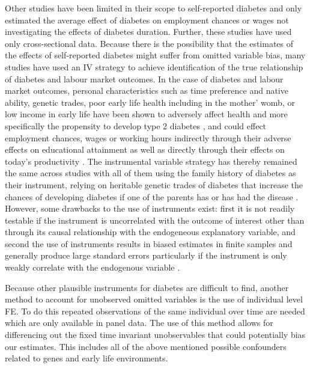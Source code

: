 Other studies have been limited in their scope to self-reported diabetes
and only estimated the average effect of diabetes on employment chances
or wages not investigating the effects of diabetes duration. Further,
these studies have used only cross-sectional data. Because there is
the possibility that the estimates of the effects of self-reported
diabetes might suffer from omitted variable bias, many studies have
used an \ac{IV} strategy to achieve identification of the true relationship
of diabetes and labour market outcomes. In the case of diabetes and
labour market outcomes, personal characteristics such as time preference
and native ability, genetic trades, poor early life health including
in the mother' womb, or low income in early life have been shown to
adversely affect health and more specifically the propensity to develop
type 2 diabetes \citep{VanEwijk2011a,Sotomayor2013,Li2010b}, and
could effect employment chances, wages or working hours indirectly
through their adverse effects on educational attainment \citep{Ayyagari2011b}
as well as directly through their effects on today's productivity
\citep{Currie2013}. The instrumental variable strategy has thereby
remained the same across studies with all of them using the family
history of diabetes as their instrument, relying on heritable genetic
trades of diabetes that increase the chances of developing diabetes
if one of the parents has or has had the disease \citep{Brown2005,Latif2009,Minor2010a,Lin2011b,Seuring2015}.
However, some drawbacks to the use of instruments exist: first it
is not readily testable if the instrument is uncorrelated with the
outcome of interest other than through its causal relationship with
the endogeneous explanatory variable, and second the use of instruments
results in biased estimates in finite samples and generally produce
large standard errors particularly if the instrument is only weakly
correlate with the endogenous variable \citep{Bound1995}. 

Because other plausible instruments for diabetes are difficult to
find, another method to account for unobserved omitted variables is
the use of individual level \ac{FE}. To do this repeated observations
of the same individual over time are needed which are only available
in panel data. The use of this method allows for differencing out
the fixed time invariant unobservables that could potentially bias
our estimates. This includes all of the above mentioned possible confounders
related to genes and early life environments.

